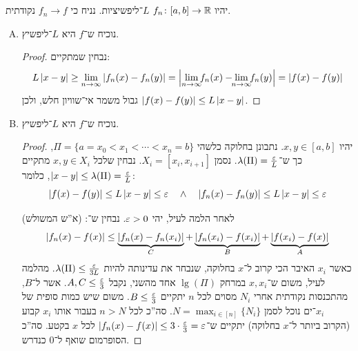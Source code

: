 \documentclass[]{../../../../tex/classes/homework}
\begin{document}
	\section{}
	יהיו $f_n \colon [a, b] \to \mathbb{R}$ $L$־ליפשיציות. נניח כי $f_n \to f$ נקודתית. 
	\begin{enumerate}[(A)]
		\item נוכיח ש־$f$ היא $L$־ליפשיץ. \begin{proof}
			נבחין שמתקיים: 
			\[ L\sof{x - y} \ge \lim_{n \to \infty}\sof{f_n(x) - f_n(y)} = \sof{\ \lim_{\mathclap{n \to \infty}}f_n(x) - \lim_{\mathclap{n \to \infty}}f_n(y)} = \sof{f(x) - f(y)} \]
			גבול משמר אי־שוויון חלש, ולכן $\left \lvert f(x)- f(y) \right \rvert \le L\left \lvert x - y \right \rvert$. 
		\end{proof}
		\item נוכיח ש־$f$ היא $L$־ליפשיץ. 
		\begin{proof}
			
			
			יהיו $x, y \in [a, b]$. 
			נתבונן בחלוקה כלשהי $\Pi = \{a = x_0 < x_1 < \cdots < x_n = b\}$, כך ש־$\lg(\Pi) = \frac{\eg}{L}$. נסמן $X_i = [x_i, x_{i + 1}]$. נבחין שלכל $x, y \in X_i$ מתקיים $\sof{x - y} \le \lg(\Pi) = \frac{\eg}{L}$, כלומר: 
			\[ \sof{f(x) - f(y)} \le L \sof{x - y} \le \eg \quad \land \quad \sof{f_n(x) - f_n(y)} \le L \sof{x - y} \le \eg \]
			
			לאחר הלמה לעיל, יהי $\eg > 0$. נבחין ש־: (א''ש המשולש)
			\[ \left \lvert f_n(x) - f(x) \right \rvert \le \underbrace{\left \lvert f_n(x) - f_n(x_i) \right \rvert}_{C} + \underbrace{\left \lvert f_n(x_i) - f(x_i) \right \rvert}_{B} + \underbrace{\left \lvert f(x_i) - f(x) \right \rvert}_{A} \]
			כאשר $x_i$ האיבר הכי קרוב ל־$x$ בחלוקה, שנבחר את עדינותה להיות $\lg(\Pi) \le \frac{\eg}{3L}$. מהלמה לעיל, משום ש־$x, x_i$ במרחק $\lg(\Pi)$ אחד מהשני, נקבל $A, C \le \frac{\eg}{3}$. אשר ל־$B$, מהתכנסות נקודתית אחרי $N_i$ מסוים לכל $n$ יתקיים $B \le \frac{\eg}{3}$. משום שיש כמות סופית של $x_i$־ים נוכל לסמן $N = \max_{i \in [n]}\{N_i\}$. סה''כ לכל $n > N$ בעבור אותו $x_i$ קבוע (הקרוב ביותר ל־$x$ בחלוקה) יתקיים ש־$\sof{f_n(x) - f(x)} \le 3 \cdot \frac{\eg}{3} = \eg$ לכל $x$ בקטע. סה''כ הסופרמום שואף ל־$0$ כנדרש. 
		\end{proof}
	\end{enumerate}
	
\end{document}

